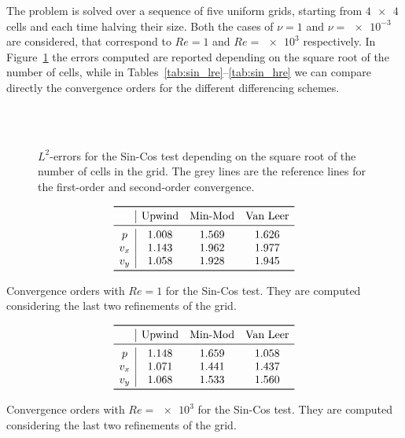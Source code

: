 The problem is solved over a sequence of five uniform grids, starting from 
$\num{4x4}$ cells and each time halving their size. Both the cases of $\nu=1$ 
and $\nu=\num{e-3}$ are considered, that correspond to $Re=1$ and $Re=\num{e3}$ 
respectively. In Figure~\ref{fig:sin_err} the errors computed are reported 
depending on the square root of the number of cells, while in 
Tables~\ref{tab:sin_lre}--\ref{tab:sin_hre} we can compare directly the 
convergence orders for the different differencing schemes.
\begin{figure}
	\centering
	\subfloat[Upwind, $Re = 1$]{
		}
	\subfloat[Upwind, $Re = \num{e3}$]{
		}\\
	\subfloat[Min-Mod, $Re = 1$]{
		}
	\subfloat[Min-Mod, $Re = \num{e3}$]{
		}\\
	\subfloat[Van Leer, $Re = 1$]{
		}
	\subfloat[Van Leer, $Re = \num{e3}$]{
		}
	\caption[$L^2$-errors for the Sin-Cos test]{$L^2$-errors for the Sin-Cos 
	test depending on the square root of the number of cells in the grid. 
	The grey lines are the reference lines for the first-order and second-order 
	convergence.}
	\label{fig:sin_err}
\end{figure}

\begin{table}
	\centering
	\[
	\begin{array}{c|ccc}
	\toprule
	& \text{Upwind} & \text{Min-Mod} & \text{Van Leer} \\ 
	\midrule
	p & 1.008 & 1.569 & 1.626\\
	v_x & 1.143 & 1.962 & 1.977\\
	v_y & 1.058 & 1.928 & 1.945\\
	\bottomrule
	\end{array}
	\]
	\caption[Convergence orders with $Re = 1$ for the Sin-Cos 
	test]{Convergence orders with $Re = 1$ for the Sin-Cos test. They are 
	computed considering the last two refinements of the grid.}
	\label{tab:sin_lre}
	\[
	\begin{array}{c|ccc}
	\toprule
	& \text{Upwind} & \text{Min-Mod} & \text{Van Leer} \\ 
	\midrule
	p & 1.148 & 1.659 & 1.058\\
	v_x & 1.071 & 1.441 & 1.437\\
	v_y & 1.068 & 1.533 & 1.560\\
	\bottomrule
	\end{array}
	\]
	\caption[Convergence orders with $Re = \num{e3}$ for the Sin-Cos 
	test]{Convergence orders with $Re = \num{e3}$ for the Sin-Cos test. 
	They are computed considering the last two refinements of the grid.}
	\label{tab:sin_hre}
\end{table}

